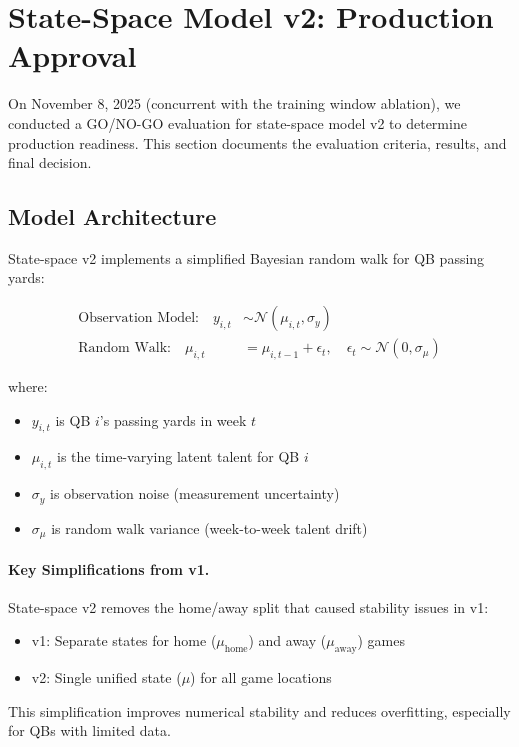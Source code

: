 \section{State-Space Model v2: Production Approval}
\label{sec:state_space_approval}

On November 8, 2025 (concurrent with the training window ablation), we conducted a GO/NO-GO evaluation for state-space model v2 to determine production readiness. This section documents the evaluation criteria, results, and final decision.

\subsection{Model Architecture}

State-space v2 implements a simplified Bayesian random walk for QB passing yards:

\begin{align}
\text{Observation Model:} \quad y_{i,t} &\sim \mathcal{N}(\mu_{i,t}, \sigma_y) \\
\text{Random Walk:} \quad \mu_{i,t} &= \mu_{i,t-1} + \epsilon_t, \quad \epsilon_t \sim \mathcal{N}(0, \sigma_\mu)
\end{align}

where:
\begin{itemize}
    \item $y_{i,t}$ is QB $i$'s passing yards in week $t$
    \item $\mu_{i,t}$ is the time-varying latent talent for QB $i$
    \item $\sigma_y$ is observation noise (measurement uncertainty)
    \item $\sigma_\mu$ is random walk variance (week-to-week talent drift)
\end{itemize}

\paragraph{Key Simplifications from v1.}
State-space v2 removes the home/away split that caused stability issues in v1:
\begin{itemize}
    \item v1: Separate states for home ($\mu_{\text{home}}$) and away ($\mu_{\text{away}}$) games
    \item v2: Single unified state ($\mu$) for all game locations
\end{itemize}

This simplification improves numerical stability and reduces overfitting, especially for QBs with limited data.

